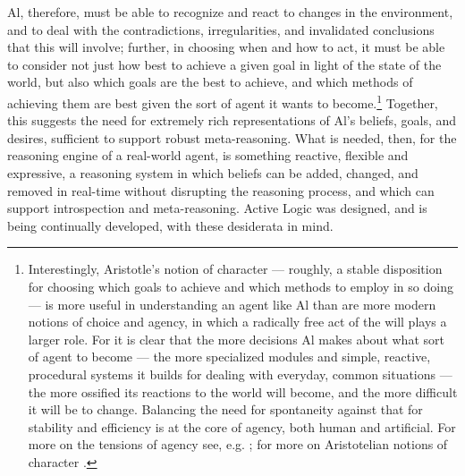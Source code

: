 \documentclass{llncs}
\begin{document}
Al, therefore, must be able to recognize and react to changes in the
environment, and to deal with the contradictions, irregularities, and
invalidated conclusions that this will involve; further, in choosing when
and how to act, it must be able to consider not just how best to achieve a
given goal in light of the state of the world, but also which goals are the
best to achieve, and which methods of achieving them are best given the
sort of agent it wants to become.\footnote{Interestingly, Aristotle's
  notion of character --- roughly, a stable disposition for choosing which
  goals to achieve and which methods to employ in so doing --- is more
  useful in understanding an agent like Al than are more modern notions of
  choice and agency, in which a radically free act of the will plays a
  larger role.  For it is clear that the more decisions Al makes about what
  sort of agent to become --- the more specialized modules and simple,
  reactive, procedural systems it builds for dealing with everyday, common
  situations --- the more ossified its reactions to the world will become,
  and the more difficult it will be to change.  Balancing the need for
  spontaneity against that for stability and efficiency is at the core of
  agency, both human and artificial.  For more on the tensions of agency
  see, e.g. \cite{Bratman_Faces,Bratman/87:inten_plans_pract}; for more on
  Aristotelian notions of character
  \cite{Aristotle:Ethics,Broadie:Aristotle}.}  Together, this suggests the
need for extremely rich representations of Al's beliefs, goals, and
desires, sufficient to support robust meta-reasoning.  What is needed,
then, for the reasoning engine of a real-world agent, is something
reactive, flexible and expressive, a reasoning system in which beliefs can
be added, changed, and removed in real-time without disrupting the
reasoning process, and which can support introspection and meta-reasoning.
Active Logic was designed, and is being continually developed, with these
desiderata in mind.
\end{document}
